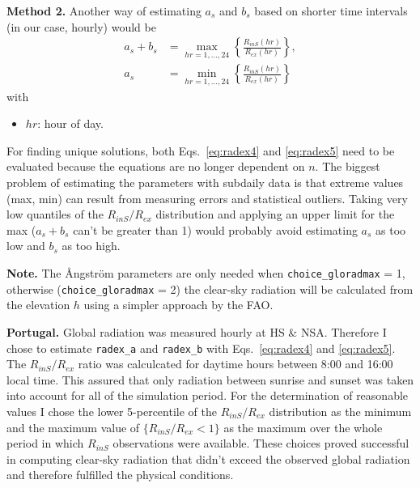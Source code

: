 \documentclass{scrreprt}
\newenvironment{denseitem}{
  \begin{itemize}
    \setlength{\itemsep}{0pt}
    \setlength{\parskip}{0pt}
    \setlength{\parsep}{0pt}
}{
  \end{itemize}
}
\begin{document}
\noindent
\textbf{Method 2.}
Another way of estimating $a_s$ and $b_s$ based on shorter time intervals (in our case, hourly) would be
\begin{align}
  a_s + b_s &= \max_{hr = 1, ..., 24} \left \{ \frac{R_{inS} (hr)}{R_{ex} (hr)} \right \}, \label{eq:radex4} \\
  a_s &= \min_{hr = 1, ..., 24} \left \{ \frac{R_{inS} (hr)}{R_{ex} (hr)} \right \} \label{eq:radex5}
\end{align}
%
with
\begin{denseitem}
  \item[] $hr$: hour of day.
\end{denseitem}
%
For finding unique solutions, both Eqs.~\eqref{eq:radex4} and \eqref{eq:radex5} need to be evaluated because the equations are no longer dependent on $n$.
The biggest problem of estimating the parameters with subdaily data is that extreme values (max, min) can result from measuring errors and statistical outliers.
Taking very low quantiles of the $R_{inS}/R_{ex}$ distribution and applying an upper limit for the max ($a_s + b_s$ can't be greater than 1) would probably avoid estimating $a_s$ as too low and $b_s$ as too high.

\noindent
\textbf{Note.}
The {\AA}ngstr\"om parameters are only needed when \verb!choice_gloradmax! = 1, otherwise (\verb!choice_gloradmax! = 2) the clear-sky radiation will be calculated from the elevation $h$ using a simpler approach by the FAO.

\noindent
\textbf{Portugal.}
Global radiation was measured hourly at HS \& NSA.
Therefore I chose to estimate \verb!radex_a! and \verb!radex_b! with Eqs.~\eqref{eq:radex4} and \eqref{eq:radex5}.
The $R_{inS}/R_{ex}$ ratio was calculcated for daytime hours between 8:00 and 16:00 local time.
This assured that only radiation between sunrise and sunset was taken into account for all of the simulation period.
For the determination of reasonable values I chose the lower 5-percentile of the $R_{inS}/R_{ex}$ distribution as the minimum and the maximum value of $\{R_{inS}/R_{ex} < 1\}$ as the maximum over the whole period in which $R_{inS}$ observations were available.
These choices proved successful in computing clear-sky radiation that didn't exceed the observed global radiation and therefore fulfilled the physical conditions.
\end{document}
